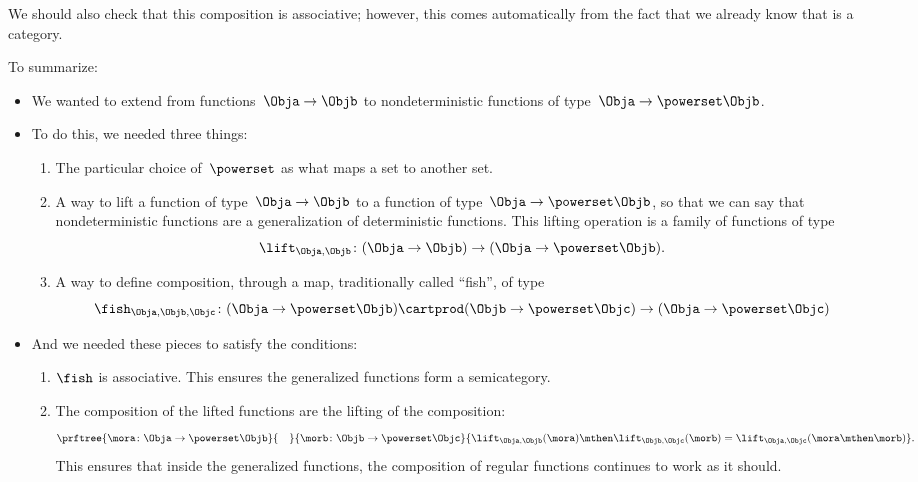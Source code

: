 We should also check that this composition is associative; however, this comes automatically from the fact that we already know that \Rel is a category.

To summarize:
\begin{itemize}
    \item We wanted to extend \Set from functions~$\Obja \to \Objb$ to nondeterministic functions of type~$\Obja \to \powerset\Objb$.
    \item To do this, we needed three things:
          \begin{enumerate}
              \item The particular choice of~$\powerset$ as what maps a set to another set.
              \item A way to lift a function of type~$\Obja \to \Objb$ to a function of type~$\Obja \to \powerset\Objb$, so that we can say that nondeterministic functions are a generalization of deterministic functions.
                    This lifting operation is a family of functions of type
                    \begin{equation}
                        \label{eq:monad-lift}
                        \lift_{\Obja, \Objb}\colon (\Obja \to \Objb) \to (\Obja \to \powerset\Objb).
                    \end{equation}
              \item A way to define composition, through a map, traditionally called ``fish'', of type
                    \begin{equation}
                        \label{eq:monad-fish}
                        \fish_{\Obja, \Objb, \Objc}\colon (\Obja \to \powerset\Objb) \cartprod (\Objb \to \powerset\Objc)
                        \to (\Obja \to \powerset \Objc)
                    \end{equation}
          \end{enumerate}
    \item And we needed these pieces to satisfy the conditions:
          \begin{enumerate}
              \item $\fish$ is associative.
                    This ensures the generalized functions form a semicategory.
              \item The composition of the lifted functions are the lifting of the composition:
                    \begin{equation}
                        \label{eq:monad-fish-associative}
                        \prftree{
                            \mora\colon \Obja \to \powerset\Objb
                            }{
                                \quad
                            }{
                                \morb\colon \Objb \to \powerset \Objc
                            }{
                            \lift_{\Obja,\Objb}(\mora)\mthen\lift_{\Objb,\Objc}(\morb) =  \lift_{\Obja,\Objc}(\mora\mthen\morb)
                            }.
                    \end{equation}
                    This ensures that inside the generalized functions, the composition of regular functions continues to work as it should.
          \end{enumerate}
\end{itemize}

